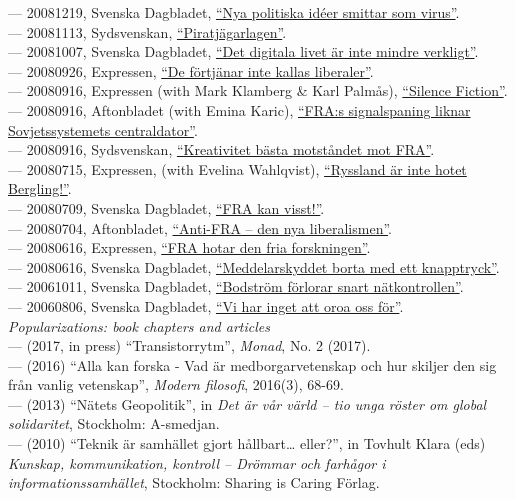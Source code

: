 \documentclass[a4paper,11pt,oneside]{article}
\begin{document}
  --- 20081219, Svenska Dagbladet, \href{}{``Nya politiska idéer smittar som virus''}. \\
  --- 20081113, Sydsvenskan, \href{http://www.sydsvenskan.se/2008-11-12/piratjagarlagen}{``Piratjägarlagen''}. \\
  --- 20081007, Svenska Dagbladet, \href{http://www.svd.se/det-digitala-livet-ar-inte-mindre-verkligt}{``Det digitala livet är inte mindre verkligt''}. \\
  --- 20080926, Expressen, \href{}{``De förtjänar inte kallas liberaler''}. \\
  --- 20080916, Expressen (with Mark Klamberg \& Karl Palmås), \href{http://www.expressen.se/kultur/silence-fiction/}{``Silence Fiction''}. \\
  --- 20080916, Aftonbladet (with Emina Karic), \href{}{``FRA:s signalspaning liknar Sovjetssystemets centraldator''}. \\
  --- 20080916, Sydsvenskan, \href{}{``Kreativitet bästa motståndet mot FRA''}. \\
  --- 20080715, Expressen, (with Evelina Wahlqvist), \href{http://www.expressen.se/debatt/ryssland-ar-inte-hotet-bergling/}{``Ryssland är inte hotet Bergling!''}. \\
  --- 20080709, Svenska Dagbladet, \href{http://www.svd.se/fra-kan-visst}{``FRA kan visst!''}. \\
  --- 20080704, Aftonbladet, \href{}{``Anti-FRA – den nya liberalismen''}. \\
  --- 20080616, Expressen, \href{http://www.expressen.se/debatt/fra-lagen-hindrar-fria-forskningen/}{``FRA hotar den fria forskningen''}. \\
  --- 20080616, Svenska Dagbladet, \href{http://www.svd.se/meddelarskyddet-bort-med-ett-knapptryck}{``Meddelarskyddet borta med ett knapptryck''}. \\
  --- 20061011, Svenska Dagbladet, \href{http://www.svd.se/bodstrom-forlorar-snart-natkontrollen}{``Bodström förlorar snart nätkontrollen''}. \\
  --- 20060806, Svenska Dagbladet,  \href{http://www.svd.se/vi-har-inget-att-oroa-oss-for}{``Vi har inget att oroa oss för''}. \\



   \noindent \emph{Popularizations: book chapters and articles}\\
     --- (2017, in press) ``Transistorrytm'', \emph{Monad}, No. 2 (2017). \\
     --- (2016) ``Alla kan forska - Vad är medborgarvetenskap och hur skiljer den sig från vanlig vetenskap'', \emph{Modern filosofi}, 2016(3), 68-69. \\
     --- (2013) ``Nätets Geopolitik'', in \emph{Det är vår värld – tio unga röster om global solidaritet}, Stockholm: A-smedjan.\\
     --- (2010) ``Teknik är samhället gjort hållbart… eller?'', in Tovhult Klara (eds) \emph{Kunskap, kommunikation, kontroll – Drömmar och farhågor i informationssamhället}, Stockholm: Sharing is Caring Förlag. \\
\end{document}
